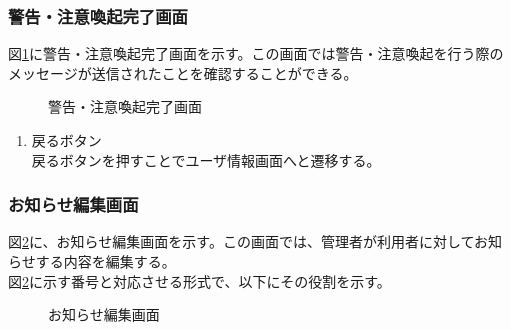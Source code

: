 \documentclass[a4j]{jarticle}
\begin{document}
\subsubsection{警告・注意喚起完了画面}
図\ref{fig:warning_ok}に警告・注意喚起完了画面を示す。この画面では警告・注意喚起を行う際のメッセージが送信されたことを確認することができる。
\begin{figure}[H]
\centering
{}
\caption{警告・注意喚起完了画面}
\label{fig:warning_ok}
\end{figure}

\begin{enumerate}
  \renewcommand{\labelenumi}{\textcircled{\scriptsize \theenumi}}

\item 戻るボタン\\
戻るボタンを押すことでユーザ情報画面へと遷移する。

\end{enumerate}


\subsubsection{お知らせ編集画面}
図\ref{fig:news_edit}に、お知らせ編集画面を示す。この画面では、管理者が利用者に対してお知らせする内容を編集する。\\
図\ref{fig:news_edit}に示す番号と対応させる形式で、以下にその役割を示す。
\begin{figure}[H]
\centering
{}
\caption{お知らせ編集画面}
\label{fig:news_edit}
\end{figure}
\end{document}

